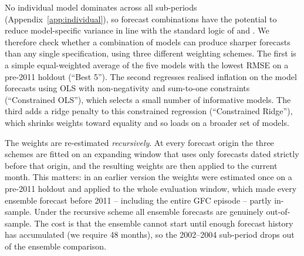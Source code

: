 \documentclass[12pt,a4paper]{article}
\begin{document}
No individual model dominates across all sub-periods (Appendix~\ref{app:individual}), so forecast combinations have the potential to reduce model-specific variance in line with the standard logic of \citet{batesgranger1969} and \citet{timmermann2006}. We therefore check whether a combination of models can produce sharper forecasts than any single specification, using three different weighting schemes. The first is a simple equal-weighted average of the five models with the lowest RMSE on a pre-2011 holdout (``Best 5''). The second regresses realised inflation on the model forecasts using OLS with non-negativity and sum-to-one constraints (``Constrained OLS''), which selects a small number of informative models. The third adds a ridge penalty to this constrained regression (``Constrained Ridge''), which shrinks weights toward equality and so loads on a broader set of models.

\begin{table}[H]
  \centering
  \caption{Forecast combination weights, averaged over the recursive (expanding-window) re-estimations, $h=3$.}
  \label{tab:ensemble_weights}
  \fontsize{8}{10}\selectfont
  
\end{table}

The weights are re-estimated \emph{recursively}. At every forecast origin the three schemes are fitted on an expanding window that uses only forecasts dated strictly before that origin, and the resulting weights are then applied to the current month. This matters: in an earlier version the weights were estimated once on a pre-2011 holdout and applied to the whole evaluation window, which made every ensemble forecast before 2011 -- including the entire GFC episode -- partly in-sample. Under the recursive scheme all ensemble forecasts are genuinely out-of-sample. The cost is that the ensemble cannot start until enough forecast history has accumulated (we require 48 months), so the 2002--2004 sub-period drops out of the ensemble comparison.
\end{document}
